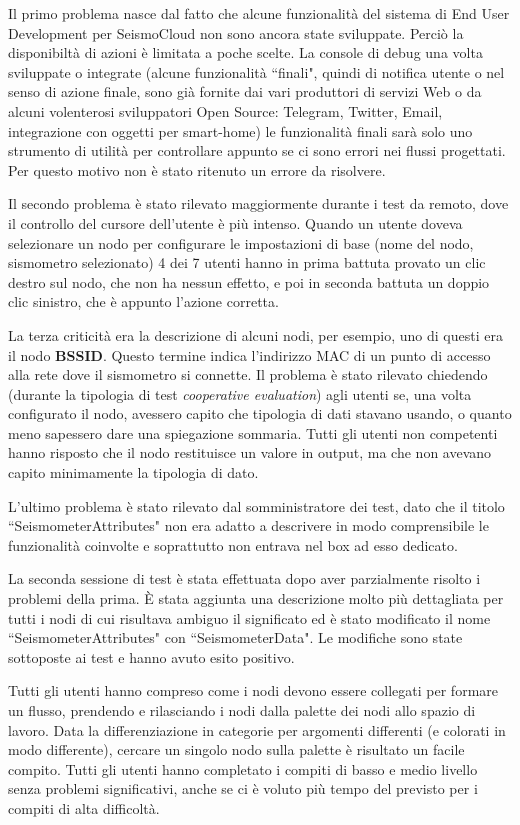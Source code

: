 \documentclass[a4paper,10pt]{memoir}
\begin{document}
Il primo problema nasce dal fatto che alcune funzionalità del sistema di End User Development per SeismoCloud non sono ancora state sviluppate. Perciò la disponibiltà di azioni è limitata a poche scelte. La console di debug una volta sviluppate o integrate (alcune funzionalità ``finali", quindi di notifica utente o nel senso di azione finale, sono già fornite dai vari produttori di servizi Web o da alcuni volenterosi sviluppatori Open Source: Telegram, Twitter, Email, integrazione con oggetti per smart-home) le funzionalità finali sarà solo uno strumento di utilità per controllare appunto se ci sono errori nei flussi progettati. Per questo motivo non è stato ritenuto un errore da risolvere.

Il secondo problema è stato rilevato maggiormente durante i test da remoto, dove il controllo del cursore dell'utente è più intenso. Quando un utente doveva selezionare un nodo per configurare le impostazioni di base (nome del nodo, sismometro selezionato) 4 dei 7 utenti hanno in prima battuta provato un clic destro sul nodo, che non ha nessun effetto, e poi in seconda battuta un doppio clic sinistro, che è appunto l'azione corretta.

La terza criticità era la descrizione di alcuni nodi, per esempio, uno di questi era il nodo \textbf{BSSID}. Questo termine indica l'indirizzo MAC di un punto di accesso alla rete dove il sismometro si connette.
Il problema è stato rilevato chiedendo (durante la tipologia di test \textit{cooperative evaluation}) agli utenti se, una volta configurato il nodo, avessero capito che tipologia di dati stavano usando, o quanto meno sapessero dare una spiegazione sommaria.
Tutti gli utenti non competenti hanno risposto che il nodo restituisce un valore in output, ma che non avevano capito minimamente la tipologia di dato.

L'ultimo problema è stato rilevato dal somministratore dei test, dato che il titolo ``SeismometerAttributes" non era adatto a descrivere in modo comprensibile le funzionalità coinvolte e soprattutto non entrava nel box ad esso dedicato.

La seconda sessione di test è stata effettuata dopo aver parzialmente risolto i problemi della prima. È stata aggiunta una descrizione molto più dettagliata per tutti i nodi di cui risultava ambiguo il significato ed è stato modificato il nome ``SeismometerAttributes" con ``SeismometerData". Le modifiche sono state sottoposte ai test e hanno avuto esito positivo.

Tutti gli utenti hanno compreso come i nodi devono essere collegati per formare un flusso, prendendo e rilasciando i nodi dalla palette dei nodi allo spazio di lavoro. Data la differenziazione in categorie per argomenti differenti (e colorati in modo differente), cercare un singolo nodo sulla palette è risultato un facile compito. Tutti gli utenti hanno completato i compiti di basso e medio livello senza problemi significativi, anche se ci è voluto più tempo del previsto per i compiti di alta difficoltà.
\end{document}
